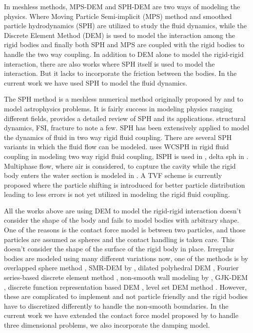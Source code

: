 \documentclass[preprint,12pt]{elsarticle}
\begin{document}
In meshless methods, MPS-DEM \cite{guo2017numerical} and SPH-DEM
\cite{canelas2016sph} are two ways of modeling the physics. Where Moving
Particle Semi-implicit (MPS) method and smoothed particle hydrodynamics (SPH)
are utilized to study the fluid dynamics, while the Discrete Element Method
(DEM) is used to model the interaction among the rigid bodies and finally both
SPH and MPS are coupled with the rigid bodies to handle the two way coupling.
In addition to DEM alone to model the rigid-rigid interaction, there are also
works where SPH \cite{amicarelli2015smoothed} itself is used to model the
interaction. But it lacks to incorporate the friction between the bodies. In
the current work we have used SPH to model the fluid dynamics.


The SPH method is a meshless numerical method originally proposed by
\citet{monaghan-gingold-stars-mnras-77} and \citet{lucy1977numerical} to model
astrophysics problems. It is fairly success in modeling physics ranging
different fields, \citet{monaghan-review:2005} provides a detailed review of
SPH and its applications. structural dynamics, FSI, fracture to note a few.
SPH has been extensively applied to model the dynamics of fluid in two way
rigid fluid coupling. There are several SPH variants in which the fluid flow
can be modeled. \citet{canelas2016sph} uses WCSPH in rigid fluid coupling in
modeling two way rigid fluid coupling, ISPH is used in \cite{asai2021fluid},
delta sph in \cite{lyu20223d}. Multiphase flow, where air is considered, to
capture the cavity while the rigid body enters the water section is modeled in
\cite{lyu2021study}. A TVF scheme is currently proposed where the particle
shifting is introduced for better particle distribution leading to less errors
is not yet utilized in modeling the rigid fluid coupling.


All the works above are using DEM to model the rigid-rigid interaction doesn't
consider the shape of the body and fails to model bodies with arbitrary shape.
One of the reasons is the contact force model is between two particles, and
those particles are assumed as spheres and the contact handling is taken care.
This doesn't consider the shape of the surface of the rigid body in place.
Irregular bodies are modeled using many different variations now, one of the
methods is by overlapped sphere method \cite{das2007modeling}, SMR-DEM by
\citet{zhan2021surface}, dilated polyhedral DEM \citet{liu2020new}, Fourier
series-based discrete element method \citet{lai2020fourier}, non-smooth wall
modeling by \citet{amaro2019improvement}, GJK-DEM \cite{wachs2012grains3d},
discrete function representation based DEM \cite{lu2012critical}, level set
DEM method \cite{duriez2021precision}. However, these are complicated to
implement and not particle friendly and the rigid bodies have to discretized
differently to handle the non-smooth boundaries. In the current work we have
extended the contact force model proposed by \citet{mohseni2021particle} to
handle three dimensional problems, we also incorporate the damping model.
\end{document}
